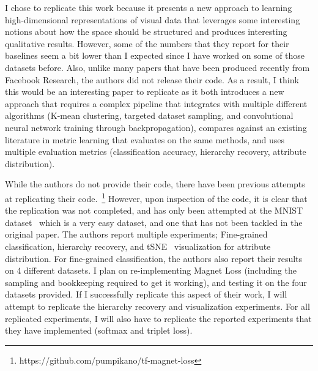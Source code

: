 \documentclass{article}
\begin{document}
I chose to replicate this work because it presents a new approach to learning high-dimensional representations of visual data that leverages some interesting notions about how the space should be structured
and produces interesting qualitative results. However, some of the numbers that they report for their baselines seem a bit lower than I expected since I have worked on some of those datasets before.
Also, unlike many papers that have been produced recently from Facebook Research, the authors did not release their code.
As a result, I think this would be an interesting paper to replicate as it both introduces a new approach that requires a complex pipeline that integrates with multiple different algorithms
(K-mean clustering, targeted dataset sampling, and convolutional neural network training through backpropagation),
compares against an existing literature in metric learning that evaluates on the same methods,
and uses multiple evaluation metrics (classification accuracy, hierarchy recovery, attribute distribution).


While the authors do not provide their code, there have been previous attempts at replicating their code.~\footnote{https://github.com/pumpikano/tf-magnet-loss}
However, upon inspection of the code, it is clear that the replication was not completed, and has only been attempted at the MNIST dataset~\cite{lecun1998gradient} which is a very easy dataset, and one that has not been tackled in the original paper.
The authors report multiple experiments; Fine-grained classification, hierarchy recovery, and tSNE~\cite{maaten2008visualizing} visualization for attribute distribution.
For fine-grained classification, the authors also report their results on 4 different datasets.
I plan on re-implementing Magnet Loss (including the sampling and bookkeeping required to get it working), and testing it on the four datasets provided.
If I successfully replicate this aspect of their work, I will attempt to replicate the hierarchy recovery and visualization experiments.
For all replicated experiments, I will also have to replicate the reported experiments that they have implemented (softmax and triplet loss).
\end{document}
